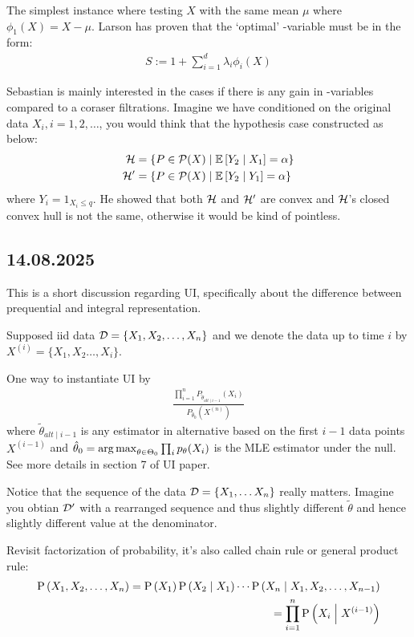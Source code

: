 The simplest instance where testing $X$ with the same mean $\mu$ where
$\phi_1(X)=X-\mu$.
Larson has proven that the `optimal' \E-variable must be in the form:
\begin{align*}
	S := 1 +\sum_{i=1}^d \lambda_i \phi_i(X)
\end{align*}

Sebastian is mainly interested in the cases if there is any gain in \E-variables
compared to a coraser filtrations.
Imagine we have conditioned on the original data $X_i, i=1,2,\dots$, you would think
that the hypothesis case constructed as below:
\begin{align}
	\Hc  & = \left\{P \in \Pc(X) \mid \condERW{Y_2}{X_1} = \alpha \right\} \\
	\Hc' & = \left\{P \in \Pc(X) \mid \condERW{Y_2}{Y_1} = \alpha \right\}
\end{align}
where $Y_i = 1_{X_i \leq q}$. He showed that both $\mathcal{H}$ and $\mathcal{H}'$ are convex
and $\mathcal{H}$'s closed convex hull is not the same, otherwise it would be kind of pointless.


\subsection*{14.08.2025}

This is a short discussion regarding UI, specifically about the difference
between prequential and integral representation.

Supposed iid data $\mathcal{D}=\{X_1,X_2,\dots,X_n\}$ and we denote
the data up to time $i$ by $X^{(i)}=\{X_1,X_2\dots,X_i\}$.

One way to instantiate UI by
\begin{align*}
	\frac{\prod_{i=1}^n P_{\tilde{\theta}_{alt\mid i-1}}(X_i)}{P_{\hat{\theta}_0}(X^{(n)})}
\end{align*}
where $\tilde{\theta}_{alt\mid i-1}$ is any estimator in alternative based on
the first $i-1$ data points $X^{(i-1)}$
and $\hat{\theta}_0=\operatorname*{arg\, max}_{\theta\in\Theta_0} \prod_i p_{\theta}(X_i)$
is the MLE estimator under the null.
See more details in section 7 of UI paper.

Notice that the sequence of the data $\mathcal{D}=\{X_1,\dots X_n\}$ really matters.
Imagine you obtian $\mathcal{D}'$ with a rearranged sequence and thus slightly
different $\tilde{\theta}$ and hence slightly different value at the
denominator.

Revisit factorization of probability, it's also called chain rule or general product rule:
\begin{align*}
	\PR{X_1,X_2,\dots,X_n} = \PR{X_1}\condPR{X_2}{X_1}\cdots \condPR{X_n}{X_1,X_2,\dots,X_{n-1}} \\
	= \prod_{i=1}^n \condPR{X_i}{X^{(i-1)}}
\end{align*}

